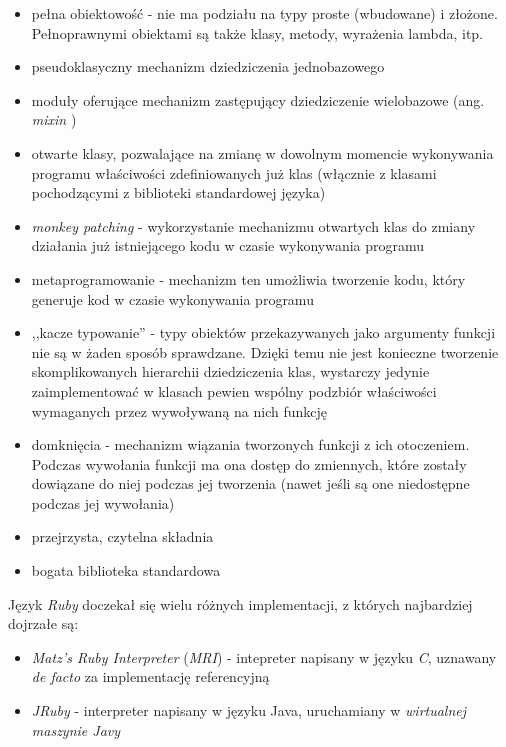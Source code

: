 \documentclass[a4paper,12pt]{article}
\begin{document}
\begin{itemize}
\item pełna obiektowość - nie ma podziału na typy proste (wbudowane) i
  złożone. Pełnoprawnymi obiektami są także klasy, metody, wyrażenia
  lambda, itp.
\item pseudoklasyczny mechanizm dziedziczenia jednobazowego
\item moduły oferujące mechanizm zastępujący dziedziczenie wielobazowe
  (ang. \emph{mixin} \cite{mixin})
\item otwarte klasy, pozwalające na zmianę w dowolnym momencie
  wykonywania programu właściwości zdefiniowanych już klas (włącznie z
  klasami pochodzącymi z biblioteki standardowej języka)
\item \emph{monkey patching} - wykorzystanie mechanizmu otwartych klas
  do zmiany działania już istniejącego kodu w czasie wykonywania
  programu \cite{monkeypatch}
\item metaprogramowanie - mechanizm ten umożliwia tworzenie kodu,
  który generuje kod w czasie wykonywania programu
  \cite{metaprogramming}
\item ,,kacze typowanie'' - typy obiektów przekazywanych jako
  argumenty funkcji nie są w żaden sposób sprawdzane. Dzięki temu nie
  jest konieczne tworzenie skomplikowanych hierarchii dziedziczenia
  klas, wystarczy jedynie zaimplementować w klasach pewien wspólny
  podzbiór właściwości wymaganych przez wywoływaną na nich funkcję
  \cite{ducktyping}
\item domknięcia - mechanizm wiązania tworzonych funkcji z ich
  otoczeniem. Podczas wywołania funkcji ma ona dostęp do zmiennych,
  które zostały dowiązane do niej podczas jej tworzenia (nawet jeśli
  są one niedostępne podczas jej wywołania) \cite{closures}
\item przejrzysta, czytelna składnia
\item bogata biblioteka standardowa
\end{itemize}

Język \emph{Ruby} doczekał się wielu różnych implementacji, z których
najbardziej dojrzałe są:

\begin{itemize}
\item \emph{Matz's Ruby Interpreter} (\emph{MRI}) - intepreter
  napisany w języku \emph{C}, uznawany \emph{de facto} za
  implementację referencyjną\cite{mri}
\item \emph{JRuby} - interpreter napisany w języku Java, uruchamiany w
  \emph{wirtualnej maszynie Javy}\cite{jruby}
\end{itemize}
\end{document}
